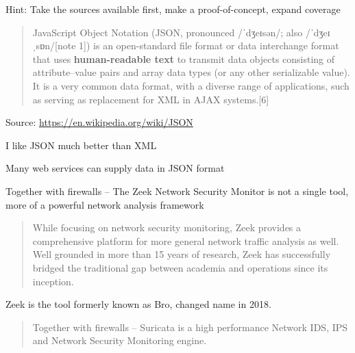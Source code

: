 \documentclass[Screen16to9,17pt]{foils}
\begin{document}
Hint: Take the sources available first, make a proof-of-concept, expand coverage



\begin{quote}
JavaScript Object Notation (JSON, pronounced /ˈdʒeɪsən/; also /ˈdʒeɪˌsɒn/[note 1]) is an open-standard file format or data interchange format that uses {\bf human-readable text} to transmit data objects consisting of attribute–value pairs and array data types (or any other serializable value). It is a very common data format, with a diverse range of applications, such as serving as replacement for XML in AJAX systems.[6]
\end{quote}
Source: \url{https://en.wikipedia.org/wiki/JSON}

\begin{list2}
\item I like JSON much better than XML
\item Many web services can supply data in JSON format
\end{list2}


Together with firewalls -- The Zeek Network Security Monitor is not a single tool, more of a powerful network analysis framework


\begin{quote}
While focusing on network security monitoring, Zeek provides a comprehensive platform for more general network traffic analysis as well. Well grounded in more than 15 years of research, Zeek has successfully bridged the traditional gap between academia and operations since its inception.
\end{quote}

Zeek is the tool formerly known as Bro, changed name in 2018. 




\begin{quote}
Together with firewalls -- Suricata is a high performance Network IDS, IPS and Network Security Monitoring engine.
\end{quote}




\end{document}
